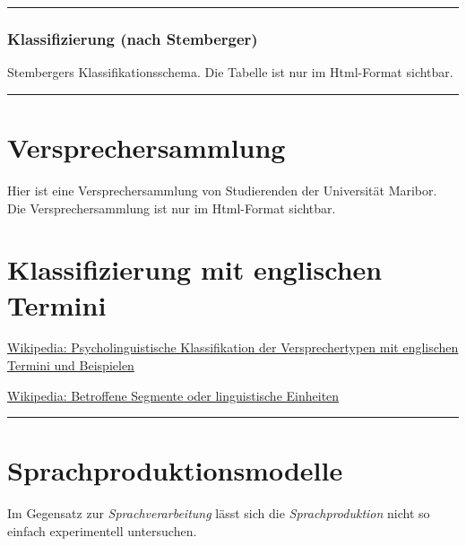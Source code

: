 \documentclass[
  letterpaper,
]{scrbook}
\begin{document}
\begin{center}\rule{0.5\linewidth}{0.5pt}\end{center}

\hypertarget{klassifizierung-nach-stemberger}{%
\subsubsection{Klassifizierung (nach
Stemberger)}\label{klassifizierung-nach-stemberger}}

Stembergers Klassifikationsschema. Die Tabelle ist nur im Html-Format
sichtbar.

\begin{center}\rule{0.5\linewidth}{0.5pt}\end{center}

\hypertarget{versprechersammlung}{%
\section{Versprechersammlung}\label{versprechersammlung}}

Hier ist eine Versprechersammlung von Studierenden der Universität
Maribor. Die Versprechersammlung ist nur im Html-Format sichtbar.

\hypertarget{klassifizierung-mit-englischen-termini}{%
\section{Klassifizierung mit englischen
Termini}\label{klassifizierung-mit-englischen-termini}}

\href{https://en.wikipedia.org/wiki/Speech_error\#Psycholinguistic_classification}{Wikipedia:
Psycholinguistische Klassifikation der Versprechertypen mit englischen
Termini und Beispielen}

\href{https://en.wikipedia.org/wiki/Speech_error\#Psycholinguistic_classification}{Wikipedia:
Betroffene Segmente oder linguistische Einheiten}

\begin{center}\rule{0.5\linewidth}{0.5pt}\end{center}

\hypertarget{sprachproduktionsmodelle}{%
\section{Sprachproduktionsmodelle}\label{sprachproduktionsmodelle}}

Im Gegensatz zur \emph{Sprachverarbeitung} lässt sich die
\emph{Sprachproduktion} nicht so einfach experimentell untersuchen.
\end{document}

